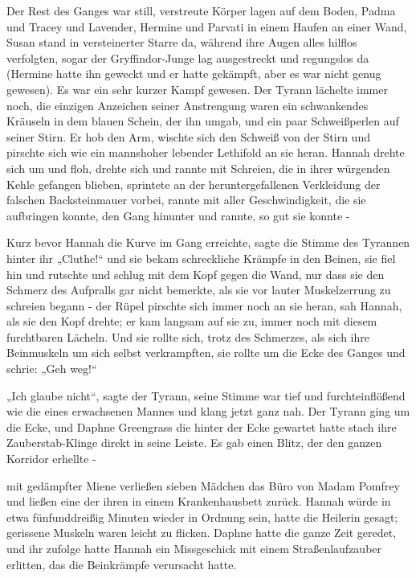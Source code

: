 {Der Rest des Ganges war still, verstreute Körper lagen auf dem Boden, Padma und Tracey und Lavender, Hermine und Parvati in einem Haufen an einer Wand, Susan stand in versteinerter Starre da, während ihre Augen alles hilflos verfolgten, sogar der Gryffindor-Junge lag ausgestreckt und regungslos da (Hermine hatte ihn geweckt und er hatte gekämpft, aber es war nicht genug gewesen). Es war ein sehr kurzer Kampf gewesen. Der Tyrann lächelte immer noch, die einzigen Anzeichen seiner Anstrengung waren ein schwankendes Kräuseln in dem blauen Schein, der ihn umgab, und ein paar Schweißperlen auf seiner Stirn. Er hob den Arm, wischte sich den Schweiß von der Stirn und pirschte sich wie ein mannshoher lebender Lethifold an sie heran. Hannah drehte sich um und floh, drehte sich und rannte mit Schreien, die in ihrer würgenden Kehle gefangen blieben, sprintete an der heruntergefallenen Verkleidung der falschen Backsteinmauer vorbei, rannte mit aller Geschwindigkeit, die sie aufbringen konnte, den Gang hinunter und rannte, so gut sie konnte -

Kurz bevor Hannah die Kurve im Gang erreichte, sagte die Stimme des Tyrannen hinter ihr „Cluthe!“ und sie bekam schreckliche Krämpfe in den Beinen, sie fiel hin und rutschte und schlug mit dem Kopf gegen die Wand, nur dass sie den Schmerz des Aufpralls gar nicht bemerkte, als sie vor lauter Muskelzerrung zu schreien begann - der Rüpel pirschte sich immer noch an sie heran, sah Hannah, als sie den Kopf drehte; er kam langsam auf sie zu, immer noch mit diesem furchtbaren Lächeln. Und sie rollte sich, trotz des Schmerzes, als sich ihre Beinmuskeln um sich selbst verkrampften, sie rollte um die Ecke des Ganges und schrie: „Geh weg!“

„Ich glaube nicht“, sagte der Tyrann, seine Stimme war tief und furchteinflößend wie die eines erwachsenen Mannes und klang jetzt ganz nah. Der Tyrann ging um die Ecke, und Daphne Greengrass die hinter der Ecke gewartet hatte stach ihre Zauberstab-Klinge direkt in seine Leiste. Es gab einen Blitz, der den ganzen Korridor erhellte -

mit gedämpfter Miene verließen sieben Mädchen das Büro von Madam Pomfrey und ließen eine der ihren in einem Krankenhausbett zurück. Hannah würde in etwa fünfunddreißig Minuten wieder in Ordnung sein, hatte die Heilerin gesagt; gerissene Muskeln waren leicht zu flicken. Daphne hatte die ganze Zeit geredet, und ihr zufolge hatte Hannah ein Missgeschick mit einem Straßenlaufzauber erlitten, das die Beinkrämpfe verursacht hatte.

}

